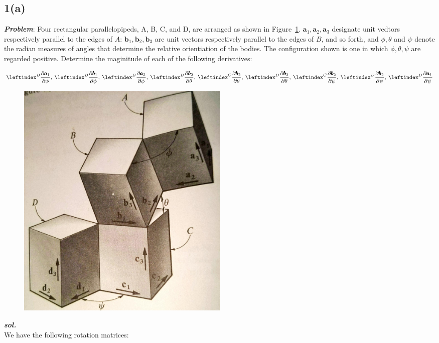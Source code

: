 \subsection{1(a)}
\textbf{\textit{Problem}}: Four rectangular parallelopipeds, A, B, C, and D, are arranged as shown in Figure~\ref{1_a}.
$\pmb a_1, \pmb a_2, \pmb a_3$ designate unit vedtors respectively parallel to the edges of $A$: $\pmb b_1, \pmb b_2, \pmb b_3$ are unit vectors respectively parallel to the edges of $B$, and so forth, and $\phi, \theta$ and $\psi$ denote the radian measures of angles that determine the relative orientiation of the bodies.
The configuration shown is one in which $\phi, \theta, \psi$ are regarded positive. Determine the maginitude of each of the following derivatives:

\begin{align*}
  \lx{^B}{\frac {\partial \pmb a_1}  {\partial \phi}}, \:
  \lx{^B}{\frac {\partial \pmb b_1}  {\partial \phi}}, \:
  \lx{^B}{\frac {\partial \pmb a_3}  {\partial \phi}}, \:
  \lx{^B}{\frac {\partial \pmb b_2}  {\partial \theta}}, \:
  \lx{^C}{\frac {\partial \pmb b_2}  {\partial \theta}}, \:
  \lx{^D}{\frac {\partial \pmb b_2}  {\partial \theta}}, \:
  \lx{^C}{\frac {\partial \pmb b_2}  {\partial \psi}}, \:
  \lx{^D}{\frac {\partial \pmb b_2}  {\partial \psi}}, \:
  \lx{^D}{\frac {\partial \pmb a_1}  {\partial \psi}}
\end{align*}

\begin{figure}[H]
    \centering
    \includegraphics[width = 0.5\textwidth, height = 0.5\textwidth]{./figs/ProbSet_1/1_a.jpg}
    \caption{}
    \label{1_a}
\end{figure}


\textbf{\textit{sol.}}\\

We have the following rotation matrices:

